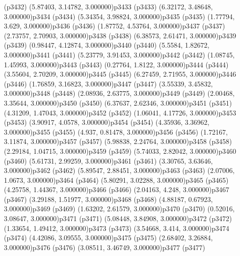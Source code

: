 \psdot(p3432)
\psPoint(5.87403, 3.14782, 3.000000){p3433}
\psdot(p3433)
\psPoint(6.32172, 3.48648, 3.000000){p3434}
\psdot(p3434)
\psPoint(5.34354, 3.98824, 3.000000){p3435}
\psdot(p3435)
\psPoint(1.77794, 3.629, 3.000000){p3436}
\psdot(p3436)
\psPoint(1.87752, 4.53764, 3.000000){p3437}
\psdot(p3437)
\psPoint(2.73757, 2.70903, 3.000000){p3438}
\psdot(p3438)
\psPoint(6.38573, 2.61471, 3.000000){p3439}
\psdot(p3439)
\psPoint(0.98447, 4.12874, 3.000000){p3440}
\psdot(p3440)
\psPoint(5.5584, 1.82672, 3.000000){p3441}
\psdot(p3441)
\psPoint(5.23779, 3.91453, 3.000000){p3442}
\psdot(p3442)
\psPoint(1.08745, 1.45993, 3.000000){p3443}
\psdot(p3443)
\psPoint(0.27764, 1.8122, 3.000000){p3444}
\psdot(p3444)
\psPoint(3.55604, 2.70209, 3.000000){p3445}
\psdot(p3445)
\psPoint(6.27459, 2.71955, 3.000000){p3446}
\psdot(p3446)
\psPoint(1.76859, 3.16823, 3.000000){p3447}
\psdot(p3447)
\psPoint(3.55339, 3.45832, 3.000000){p3448}
\psdot(p3448)
\psPoint(2.08936, 2.63775, 3.000000){p3449}
\psdot(p3449)
\psPoint(2.00468, 3.35644, 3.000000){p3450}
\psdot(p3450)
\psPoint(6.37637, 2.62346, 3.000000){p3451}
\psdot(p3451)
\psPoint(4.31209, 1.47043, 3.000000){p3452}
\psdot(p3452)
\psPoint(1.06041, 4.17726, 3.000000){p3453}
\psdot(p3453)
\psPoint(3.90917, 4.0578, 3.000000){p3454}
\psdot(p3454)
\psPoint(4.35936, 3.36962, 3.000000){p3455}
\psdot(p3455)
\psPoint(4.937, 0.81478, 3.000000){p3456}
\psdot(p3456)
\psPoint(1.72167, 3.11874, 3.000000){p3457}
\psdot(p3457)
\psPoint(5.98838, 2.24764, 3.000000){p3458}
\psdot(p3458)
\psPoint(2.29184, 1.04715, 3.000000){p3459}
\psdot(p3459)
\psPoint(5.74033, 2.82042, 3.000000){p3460}
\psdot(p3460)
\psPoint(5.61731, 2.99259, 3.000000){p3461}
\psdot(p3461)
\psPoint(3.30765, 3.63646, 3.000000){p3462}
\psdot(p3462)
\psPoint(5.89547, 2.88451, 3.000000){p3463}
\psdot(p3463)
\psPoint(2.07006, 1.0673, 3.000000){p3464}
\psdot(p3464)
\psPoint(5.80291, 3.02288, 3.000000){p3465}
\psdot(p3465)
\psPoint(4.25758, 1.44367, 3.000000){p3466}
\psdot(p3466)
\psPoint(2.04163, 4.248, 3.000000){p3467}
\psdot(p3467)
\psPoint(3.29188, 1.51977, 3.000000){p3468}
\psdot(p3468)
\psPoint(4.88187, 0.67923, 3.000000){p3469}
\psdot(p3469)
\psPoint(1.63202, 2.61579, 3.000000){p3470}
\psdot(p3470)
\psPoint(0.52016, 3.08647, 3.000000){p3471}
\psdot(p3471)
\psPoint(5.08448, 3.84908, 3.000000){p3472}
\psdot(p3472)
\psPoint(1.33654, 1.49412, 3.000000){p3473}
\psdot(p3473)
\psPoint(3.54668, 3.414, 3.000000){p3474}
\psdot(p3474)
\psPoint(4.42086, 3.09555, 3.000000){p3475}
\psdot(p3475)
\psPoint(2.68402, 3.26884, 3.000000){p3476}
\psdot(p3476)
\psPoint(3.08511, 3.46749, 3.000000){p3477}
\psdot(p3477)
